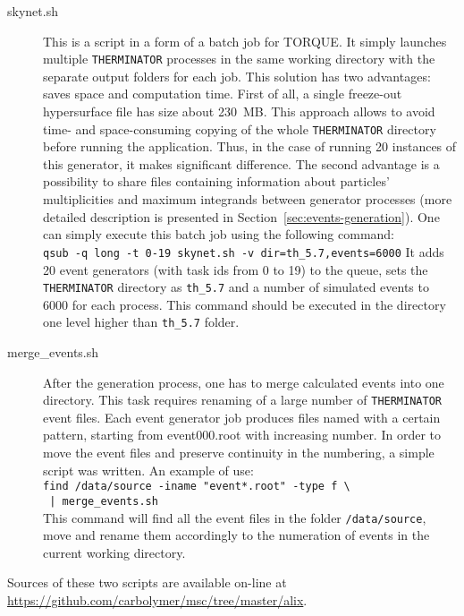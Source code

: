     \begin{description}
      \item[skynet.sh] This is a script in a form of a batch job for TORQUE.
        It simply launches multiple \verb|THERMINATOR| processes in the same working directory with the separate output folders for each job.
        This solution has two advantages: saves space and computation time.
        First of all, a single freeze-out hypersurface file has size about 230~MB.
        This approach allows to avoid time- and space-consuming copying of the whole \verb|THERMINATOR| directory before running the application.
        Thus, in the case of running 20 instances of this generator, it makes significant difference.
        The second advantage is a possibility to share files containing information about particles' multiplicities and maximum integrands between generator processes (more detailed description is presented in Section~\ref{sec:events-generation}).
        One can simply execute this batch job using the following command:
        \\\verb|qsub -q long -t 0-19 skynet.sh -v dir=th_5.7,events=6000|
        It adds 20 event generators (with task ids from 0 to 19) to the queue, sets the \verb|THERMINATOR| directory as \verb|th_5.7| and a number of simulated events to 6000 for each process.
        This command should be executed in the directory one level higher than \verb|th_5.7| folder.
      \item[merge\_events.sh] After the generation process, one has to merge calculated events into one directory.
        This task requires renaming of a large number of \verb|THERMINATOR| event files.
        Each event generator job produces files named with a certain pattern, starting from event000.root with increasing number.
        In order to move the event files and preserve continuity in the numbering, a simple script was written.
        An example of use:
        \\\verb&find /data/source -iname "event*.root" -type f \ &
        \\\verb& | merge_events.sh&\\
        This command will find all the event files in the folder \verb|/data/source|, move and rename them accordingly to the numeration of events in the current working directory.
    \end{description}
    Sources of these two scripts are available on-line at \url{https://github.com/carbolymer/msc/tree/master/alix}.
